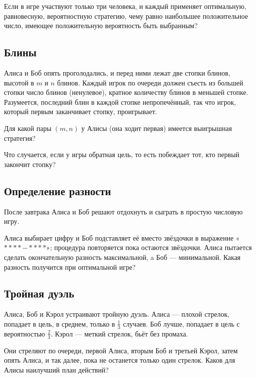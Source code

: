 Если в игре участвуют только три человека, и каждый применяет оптимальную, равновесную, вероятностную стратегию, чему равно наибольшее положительное число, имеющее положительную вероятность быть выбранным?

\subsection*{Блины}%

Алиса и Боб опять проголодались, и перед ними лежат две стопки блинов, высотой в $m$ и $n$ блинов.
Каждый игрок по очереди должен съесть из большей стопки число блинов (ненулевое), кратное количеству блинов в меньшей стопке.
Разумеется, последний блин в каждой стопке непропечённый, так что игрок, который первым заканчивает стопку, проигрывает.

Для какой пары $(m,n)$ у Алисы (она ходит первая) имеется выигрышная стратегия?

Что случается, если у игры обратная цель, то есть побеждает тот, кто первый закончит стопку?

\subsection*{Определение разности}%

После завтрака Алиса и Боб решают отдохнуть и сыграть в простую числовую игру.

\medskip

Алиса выбирает цифру и Боб подставляет её вместо звёздочки в выражение «$**** - ****$»; процедура повторяется пока остаются звёздочки. 
Алиса пытается сделать окончательную разность максимальной, a Боб --- минимальной.
Какая разность получится при оптимальной игре?

\subsection*{Тройная дуэль}%

Алиса, Боб и Кэрол устраивают тройную дуэль.
Алиса --- плохой стрелок, попадает в цель, в среднем, только в $\tfrac13$ случаев.
Боб лучше, попадает в цель с вероятностью $\tfrac23$.
Кэрол --- меткий стрелок, бьёт без промаха.

Они стреляют по очереди, первой Алиса, вторым Боб и третьей Кэрол, затем опять Алиса, и так далее, пока не останется только один стрелок.
Каков для Алисы наилучший план действий?
